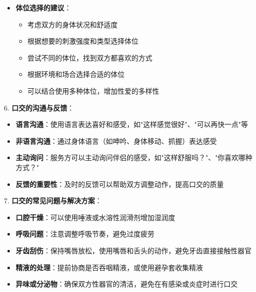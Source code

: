\documentclass[12pt,UTF8]{ctexbook}
\begin{document}
\begin{itemize}
\begin{itemize}
\begin{itemize}
      \item 适用场景：适合希望尝试新姿势，增加刺激的伴侣
      \item 优缺点：优点是可以同时刺激阴蒂和肛门周围区域；缺点是伴侣的姿势可能不太舒适
      \end{itemize}
    \item \textbf{女上位69式}：
      \begin{itemize}
      \item 做法：女性坐在男性脸上，同时为男性进行口交
      \item 适用场景：适合女性希望掌握主动权的情况
      \item 优缺点：优点是女性可以控制节奏和深度；缺点是男性的颈部可能会疲劳
      \end{itemize}
    \end{itemize}
  \item \textbf{体位选择的建议}：
    \begin{itemize}
    \item 考虑双方的身体状况和舒适度
    \item 根据想要的刺激强度和类型选择体位
    \item 尝试不同的体位，找到双方都喜欢的方式
    \item 根据环境和场合选择合适的体位
    \item 可以结合使用多种体位，增加性爱的多样性
    \end{itemize}
  \end{itemize}

6. 	\textbf{口交的沟通与反馈}：
  \begin{itemize}
  \item \textbf{语言沟通}：使用语言表达喜好和感受，如"这样感觉很好"、"可以再快一点"等
  \item \textbf{非语言沟通}：通过身体语言（如呻吟、身体移动、抓握）表达感受
  \item \textbf{主动询问}：服务方可以主动询问伴侣的感受，如"这样舒服吗？"、"你喜欢哪种方式？"
  \item \textbf{反馈的重要性}：及时的反馈可以帮助双方调整动作，提高口交的质量
  \end{itemize}

7. 	\textbf{口交的常见问题与解决方案}：
  \begin{itemize}
  \item \textbf{口腔干燥}：可以使用唾液或水溶性润滑剂增加湿润度
  \item \textbf{呼吸问题}：注意调整呼吸节奏，避免过度疲劳
  \item \textbf{牙齿刮伤}：保持嘴唇放松，使用嘴唇和舌头的动作，避免牙齿直接接触性器官
  \item \textbf{精液的处理}：提前协商是否吞咽精液，或使用避孕套收集精液
  \item \textbf{异味或分泌物}：确保双方性器官的清洁，避免在有感染或炎症时进行口交
  \end{itemize}
\end{document}
